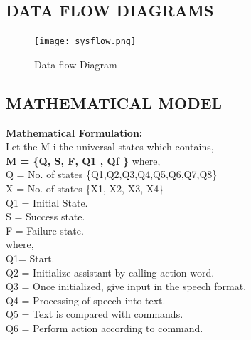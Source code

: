 \documentclass[12pt]{extreport}
\begin{document}
     \subsection{DATA FLOW DIAGRAMS}
     
    \begin{figure}[H]
    \centering
    \texttt{[image: sysflow.png]}\\
    \caption{Data-flow Diagram}
    \end{figure}


     \pagebreak
     \subsection{MATHEMATICAL MODEL}
     \textbf{Mathematical Formulation:}\\
Let the M i the universal states which contains, \\
    \textbf{M = \{Q, S, F, Q1 , Qf \}} \newline
    where, \\
    \newline
    		Q = No. of states \{Q1,Q2,Q3,Q4,Q5,Q6,Q7,Q8\}\\
    		X = No. of states \{X1, X2, X3, X4\}\\
    		Q1 = Initial State.\\
    		S = Success state.\\
    		F = Failure state.\\
    		\newline
    where,\\ 
    \newline
    Q1= Start.\\
     \newline
    Q2 = Initialize assistant by calling action word. \\
    \newline
    Q3 = Once initialized, give input in the speech format.\\
    \newline
    Q4 = Processing of speech into text.\\
    \newline 
    Q5 = Text is compared with commands.\\
    \newline
    Q6 = Perform action according to command.\\
\end{document}
